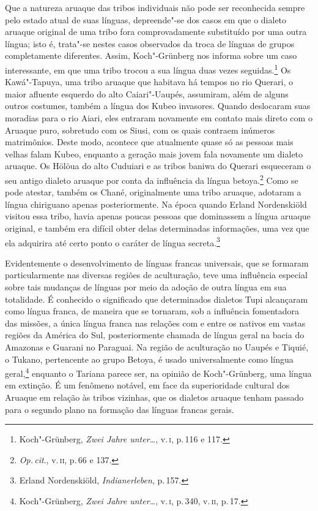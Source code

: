 Que a natureza aruaque das tribos individuais não pode ser reconhecida
sempre pelo estado atual de suas línguas, depreende"-se dos casos em que
o dialeto aruaque original de uma tribo fora comprovadamente substituído
por uma outra língua; isto é, trata"-se nestes casos observados da troca
de línguas de grupos completamente diferentes. Assim, Koch"-Grünberg nos
informa sobre um caso interessante, em que uma tribo trocou a sua língua
duas vezes seguidas.\footnote{Koch"-Grünberg, \textit{Zwei Jahre unter\ldots}, v.\,\textsc{i}, p.\,116 e 117.} Os Kawá"-Tapuya, uma tribo aruaque que
habitava há tempos no rio Querari, o maior afluente esquerdo do alto
Caiari"-Uaupés, assumiram, além de alguns outros costumes, também a
língua dos Kubeo invasores. Quando deslocaram suas moradias para o rio
Aiari, eles entraram novamente em contato mais direto com o Aruaque
puro, sobretudo com os Siusi, com os quais contraem inúmeros
matrimônios. Deste modo, acontece que atualmente quase só as pessoas
mais velhas falam Kubeo, enquanto a geração mais jovem fala novamente um
dialeto aruaque. Os Hölöua do alto Cuduiari e as tribos baniwa do
Querari esqueceram o seu antigo dialeto aruaque por conta da influência
da língua betoya.\footnote{\textit{Op.\,cit}., v.\,\textsc{ii}, p.\,66 e 137.} Como se pode
atestar, também os Chané, originalmente uma tribo aruaque, adotaram a
língua chiriguano apenas posteriormente. Na época quando Erland
Nordenskiöld visitou essa tribo, havia apenas poucas pessoas que
dominassem a língua aruaque original, e também era difícil obter delas
determinadas informações, uma vez que ela adquirira até
certo ponto o caráter de língua secreta.\footnote{Erland Nordenskiöld,
  \textit{Indianerleben}, p.\,157.}

Evidentemente o desenvolvimento de línguas francas universais, que se
formaram particularmente nas diversas regiões de aculturação, teve uma
influência especial sobre tais mudanças de línguas por meio da adoção
de outra língua em sua totalidade. É conhecido o significado que
determinados dialetos Tupi alcançaram como língua franca, de maneira que
se tornaram, sob a influência fomentadora das missões, a única língua
franca nas relações com e entre os nativos em vastas regiões da América
do Sul, posteriormente chamada de língua geral na bacia do Amazonas e
Guarani no Paraguai. Na região de aculturação no Uaupés e Tiquié, o
Tukano, pertencente ao grupo Betoya, é usado universalmente como língua
geral,\footnote{Koch"-Grünberg, \textit{Zwei Jahre unter\ldots}, v.\,\textsc{i}, p.\,340, v.\,\textsc{ii}, p.\,17.} enquanto o Tariana parece ser, na opinião
de Koch"-Grünberg, uma língua em extinção. É um fenômeno notável, em face
da superioridade cultural dos Aruaque em relação às tribos vizinhas, que
os dialetos aruaque tenham passado para o segundo plano na formação
das línguas francas gerais.

